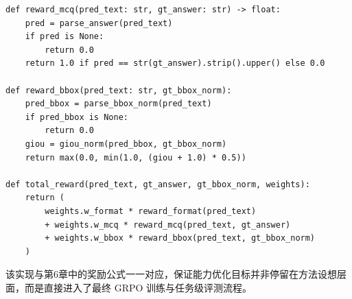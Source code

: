 \begin{thesisappendix}
\begin{verbatim}
def reward_mcq(pred_text: str, gt_answer: str) -> float:
    pred = parse_answer(pred_text)
    if pred is None:
        return 0.0
    return 1.0 if pred == str(gt_answer).strip().upper() else 0.0

def reward_bbox(pred_text: str, gt_bbox_norm):
    pred_bbox = parse_bbox_norm(pred_text)
    if pred_bbox is None:
        return 0.0
    giou = giou_norm(pred_bbox, gt_bbox_norm)
    return max(0.0, min(1.0, (giou + 1.0) * 0.5))

def total_reward(pred_text, gt_answer, gt_bbox_norm, weights):
    return (
        weights.w_format * reward_format(pred_text)
        + weights.w_mcq * reward_mcq(pred_text, gt_answer)
        + weights.w_bbox * reward_bbox(pred_text, gt_bbox_norm)
    )
\end{verbatim}

该实现与第6章中的奖励公式一一对应，保证能力优化目标并非停留在方法设想层面，而是直接进入了最终 GRPO 训练与任务级评测流程。
\end{thesisappendix}
